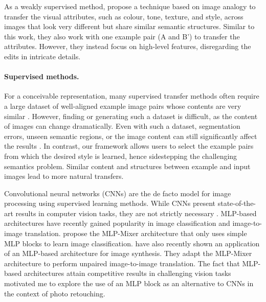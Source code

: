 
As a weakly supervised method, \citeauthor{visual_attribute} \cite{visual_attribute} propose a technique based on image analogy \cite{Hertzmann01Image} to transfer the visual attributes, such as colour, tone, texture, and style, across images that look very different but share similar semantic structures. Similar to this work, they also work with one example pair (A and B') to transfer the attributes. However, they instead focus on high-level features, disregarding the edits in intricate details.

\paragraph{Supervised methods.} 
For a conceivable representation, many supervised transfer methods often require a large dataset of well-aligned example image pairs whose contents are very similar \cite{kim2021representative, wang2019underexposed}. However, finding or generating such a dataset is difficult, as the content of images can change dramatically. Even with such a dataset, segmentation errors, unseen semantic regions, or the image content can still significantly affect the results \cite{10.1145/2790296}. In contrast, our framework allows users to select the example pairs from which the desired style is learned, hence sidestepping the challenging semantics problem. Similar content and structures between example and input images lead to more natural transfers.

Convolutional neural networks (\gls{CNN}s) are the de facto model for image processing using supervised learning methods. While \gls{CNN}s present state-of-the-art results in computer vision tasks, they are not strictly necessary \cite{tolstikhin2021mlp}. \gls{MLP}-based architectures have recently gained popularity in image classification and image-to-image translation. \citeauthor{cazenavette2021mixergan} \cite{cazenavette2021mixergan} propose the \gls{MLP}-Mixer architecture that only uses simple \gls{MLP} blocks to learn image classification. \citeauthor{cazenavette2021mixergan} \cite{cazenavette2021mixergan} have also recently shown an application of an \gls{MLP}-based architecture for image synthesis. They adapt the \gls{MLP}-Mixer architecture \cite{tolstikhin2021mlp} to perform unpaired image-to-image translation. The fact that \gls{MLP}-based architectures attain competitive results in challenging vision tasks motivated me to explore the use of an \gls{MLP} block as an alternative to \gls{CNN}s in the context of photo retouching.

